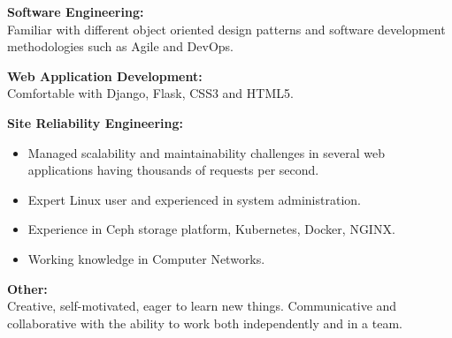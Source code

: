 \documentclass[margin]{res}
\begin{document}
\begin{resume}
    {\bf Software Engineering:}
    \\Familiar with different object oriented design patterns and software development methodologies such as Agile and DevOps.

	{\bf Web Application Development:}
	\\Comfortable with Django, Flask, CSS3 and HTML5.

	{\bf Site Reliability Engineering:}
	\begin{itemize}
		\item Managed scalability and maintainability challenges in several web applications having thousands of requests per second.
		\item Expert Linux user and experienced in system administration.
		\item Experience in Ceph storage platform, Kubernetes, Docker, NGINX.
		\item Working knowledge in Computer Networks.
	\end{itemize}

	{\bf Other:}
	\\Creative, self-motivated, eager to learn new things. Communicative and collaborative with the ability to work both independently and in a team.

\end{resume}
\end{document}
